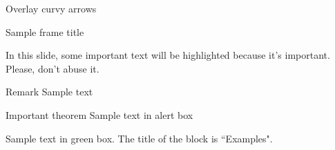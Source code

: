 \documentclass[11pt,aspectratio=169,t]{beamer}
\begin{document}
\begin{frame}{Overlay curvy arrows}
	\vfill
\end{frame}

\begin{frame}{Sample frame title}
    
    In this slide, some important text will be
    \alert{highlighted} because it's important. Please, don't abuse it.
    
    \begin{block}{Remark}
        Sample text
    \end{block}
    
    \begin{alertblock}{Important theorem}
        Sample text in alert box
    \end{alertblock}
    
    \begin{examples}
        Sample text in green box. The title of the block is ``Examples".
    \end{examples}
    
\end{frame}
\end{document}
